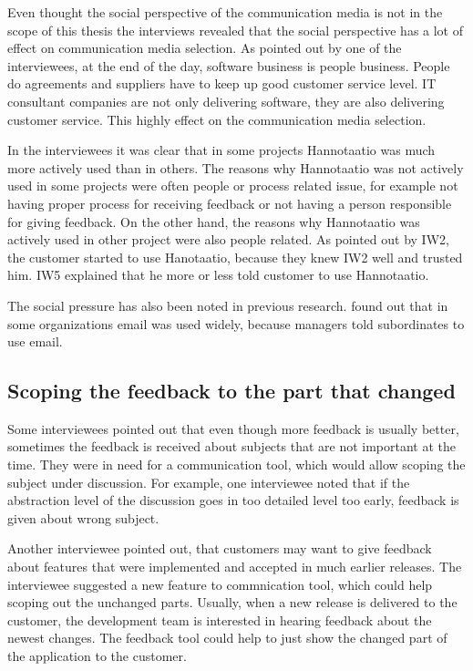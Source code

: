 \documentclass[english,12pt,a4paper,pdftex]{article}
\begin{document}
Even thought the social perspective of the communication media is not in the scope of this thesis the interviews revealed that the social perspective has a lot of effect on communication media selection. As pointed out by one of the interviewees, at the end of the day, software business is people business. People do agreements and suppliers have to keep up good customer service level. IT consultant companies are not only delivering software, they are also delivering customer service. This highly effect on the communication media selection.

In the interviewees it was clear that in some projects Hannotaatio was much more actively used than in others. The reasons why Hannotaatio was not actively used in some projects were often people or process related issue, for example not having proper process for receiving feedback or not having a person responsible for giving feedback. On the other hand, the reasons why Hannotaatio was actively used in other project were also people related. As pointed out by IW2, the customer started to use Hanotaatio, because they knew IW2 well and trusted him. IW5 explained that he more or less told customer to use Hannotaatio.

The social pressure has also been noted in previous research. \citet{elshinnawy1997} found out that in some organizations email was used widely, because managers told subordinates to use email.

\subsection{Scoping the feedback to the part that changed}

Some interviewees pointed out that even though more feedback is usually better, sometimes the feedback is received about subjects that are not important at the time. They were in need for a communication tool, which would allow scoping the subject under discussion. For example, one interviewee noted that if the abstraction level of the discussion goes in too detailed level too early, feedback is given about wrong subject.

Another interviewee pointed out, that customers may want to give feedback about features that were implemented and accepted in much earlier releases. The interviewee suggested a new feature to commnication tool, which could help scoping out the unchanged parts. Usually, when a new release is delivered to the customer, the development team is interested in hearing feedback about the newest changes. The feedback tool could help to just show the changed part of the application to the customer.
\end{document}
